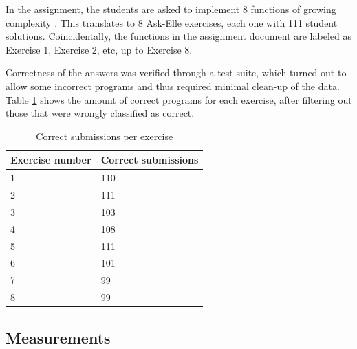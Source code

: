 

In the assignment, the students are asked to implement 8 functions of growing complexity \cite{assignment1}. This translates to 8 Ask-Elle exercises, each one with 111 student solutions. Coincidentally, the functions in the assignment document are labeled as Exercise 1, Exercise 2, etc, up to Exercise 8.

Correctness of the answers was verified through a test suite, which turned out to allow some incorrect programs and thus required minimal clean-up of the data. Table \ref{tb:correct-submissions-per-exercise} shows the amount of correct programs for each exercise, after filtering out those that were wrongly classified as correct.

\begin{table}[H]
\centering
\begin{tabular}{ m{12em} | m{12em} }
    Exercise number & Correct submissions \\
    \hline
    1 & 110 \\
    \hline
    2 & 111 \\
    \hline
    3 & 103 \\
    \hline
    4 & 108 \\
    \hline
    5 & 111 \\
    \hline
    6 & 101 \\
    \hline
    7 & 99 \\
    \hline
    8 & 99
\end{tabular}
\caption{Correct submissions per exercise}
\label{tb:correct-submissions-per-exercise}
\end{table}

\subsection{Measurements}
\label{sec:method-measurement-definitions}

